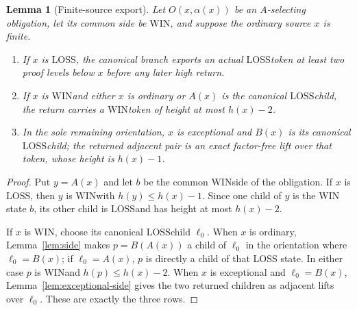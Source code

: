 \documentclass[11pt]{article}
\newtheorem{lemma}[theorem]{Lemma}
\newcommand{\WIN}{\ensuremath{\mathrm{WIN}}}
\newcommand{\LOSS}{\ensuremath{\mathrm{LOSS}}}
\begin{document}
\begin{lemma}[Finite-source export]\label{lem:finite-export}
Let $O(x,\alpha(x))$ be an $A$-selecting obligation, let its common side be
\WIN, and suppose the ordinary source $x$ is finite.
\begin{enumerate}[label=(\alph*)]
\item If $x$ is \LOSS, the canonical branch exports an actual \LOSS token
      at least two proof levels below $x$ before any later high return.
\item If $x$ is \WIN and either $x$ is ordinary or $A(x)$ is the
      canonical \LOSS child, the return carries a \WIN token of height at
      most $h(x)-2$.
\item In the sole remaining orientation, $x$ is exceptional and $B(x)$ is
      its canonical \LOSS child; the returned adjacent pair is an exact
      factor-free lift over that token, whose height is $h(x)-1$.
\end{enumerate}
\end{lemma}

\begin{proof}
Put $y=A(x)$ and let $b$ be the common \WIN side of the obligation.  If
$x$ is \LOSS, then $y$ is \WIN with $h(y)\le h(x)-1$.  Since one child of
$y$ is the \WIN state $b$, its other child is \LOSS and has height at most
$h(x)-2$.

If $x$ is \WIN, choose its canonical \LOSS child $\ell_0$.  When $x$ is
ordinary, Lemma~\ref{lem:side} makes $p=B(A(x))$ a child of $\ell_0$ in the
orientation where $\ell_0=B(x)$; if $\ell_0=A(x)$, $p$ is directly a child
of that LOSS state.  In either case $p$ is \WIN and
$h(p)\le h(x)-2$.  When $x$ is exceptional and
$\ell_0=B(x)$, Lemma~\ref{lem:exceptional-side} gives the two returned
children as adjacent lifts over $\ell_0$.  These are exactly the three rows.
\end{proof}
\end{document}
